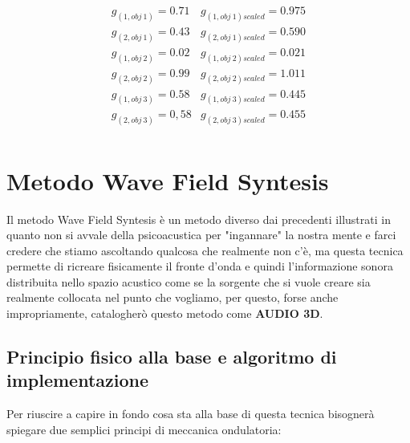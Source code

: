 \documentclass[12pt,a4paper]{report}
\begin{document}
\begin{equation}
\begin{matrix}
g_{(1,obj\ 1)} = 0.71 & g_{(1,obj\ 1)scaled} = 0.975 \\ 
g_{(2,obj\ 1)} = 0.43 & g_{(2,obj\ 1)scaled} = 0.590       \\
g_{(1,obj\ 2)} = 0.02 & g_{(1,obj\ 2)scaled} = 0.021\\
g_{(2,obj\ 2)} = 0.99 & g_{(2,obj\ 2)scaled} = 1.011\\
g_{(1,obj\ 3)} = 0.58 & g_{(1,obj\ 3)scaled} = 0.445\\
g_{(2,obj\ 3)} = 0,58 & g_{(2,obj\ 3)scaled} = 0.455\\
\end{matrix} 
\label{gscalatiesempio3}
\end{equation}








\chapter{Metodo Wave Field Syntesis}

Il metodo Wave Field Syntesis è un metodo diverso dai precedenti illustrati in quanto non si avvale della psicoacustica per "ingannare" la nostra mente e farci credere che stiamo ascoltando qualcosa che realmente non c'è, ma questa tecnica permette di ricreare fisicamente il fronte d'onda e quindi l'informazione sonora distribuita nello spazio acustico come se la sorgente che si vuole creare sia realmente collocata nel punto che vogliamo, per questo, forse anche impropriamente, catalogherò questo metodo come \textbf{AUDIO 3D}.\\

\section{Principio fisico alla base e algoritmo di implementazione}

Per riuscire a capire in fondo cosa sta alla base di questa tecnica bisognerà spiegare due semplici principi di meccanica ondulatoria: 
\end{document}
